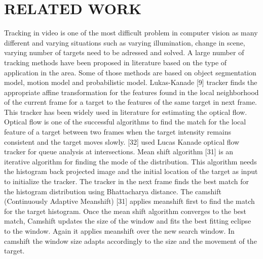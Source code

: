 %
%
%

\chapter{\uppercase{Related Work}}


Tracking in video is one of the most difficult problem in computer vision as many different and varying situations such as varying illumination, change in scene, varying number of targets need to be adressed and solved. A large number of tracking methods have been proposed in literature based on the type of application in the area. Some of those methods are based on object segmentation model, motion model and probabilistic model. Lukas-Kanade [9] tracker finds the appropriate affine transformation for the features found in the local neighborhood of the current frame for a target to the features of the same target in next frame. This tracker has been widely used in literature for estimating the optical flow. Optical flow is one of the successful algorithms to find the match for the local feature of a target between two frames when the target intensity remains consistent and the target moves slowly. [32] used Lucas Kanade optical flow tracker for queue analysis at intersections. Mean shift algorithm [31] is an iterative algorithm for finding the mode of the distribution. This algorithm needs the histogram back projected image and the initial location of the target as input to initialize the tracker. The tracker in the next frame finds the best match for the histogram distribution using Bhattacharya distance. The camshift (Continuously Adaptive Meanshift) [31] applies meanshift first to find the match for the target histogram. Once the mean shift algorithm converges to the best match, Camshift updates the size of the window and fits the best fitting eclipse to the window. Again it applies meanshift over the new search window. In camshift the window size adapts accordingly to the size and the movement of the target.

